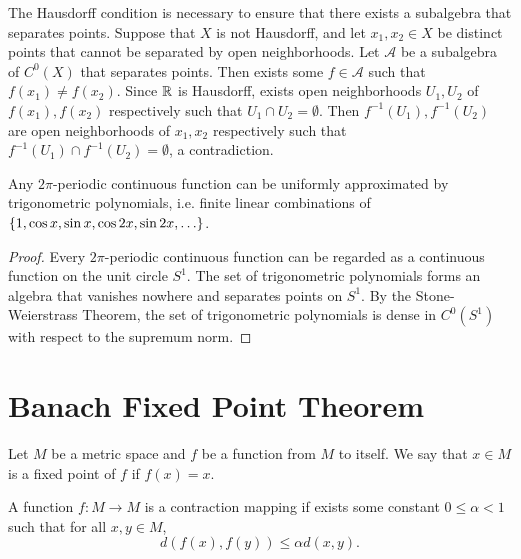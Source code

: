 \begin{rmk}
    The Hausdorff condition is necessary to ensure that there exists a subalgebra that separates points. Suppose that $X$ is not Hausdorff, and let $x_1, x_2 \in X$ be distinct points that cannot be separated by open neighborhoods. Let $\mathcal A$ be a subalgebra of $C^0(X)$ that separates points. Then exists some $f \in \mathcal A$ such that $f(x_1) \neq f(x_2)$. Since ${\mathbb R}$ is Hausdorff, exists open neighborhoods $U_1, U_2$ of $f(x_1), f(x_2)$ respectively such that $U_1 \cap U_2 = \emptyset$. Then $f^{-1}(U_1), f^{-1}(U_2)$ are open neighborhoods of $x_1, x_2$ respectively such that $f^{-1}(U_1) \cap f^{-1}(U_2) = \emptyset$, a contradiction.
\end{rmk}

\begin{cl}
    Any $2\pi$-periodic continuous function can be uniformly approximated by trigonometric polynomials, i.e. finite linear combinations of ${\left\{{1, \cos x, \sin x, \cos 2x, \sin 2x, \ldots}\right\}}$.
    \begin{proof}
        Every $2\pi$-periodic continuous function can be regarded as a continuous function on the unit circle $S^1$. The set of trigonometric polynomials forms an algebra that vanishes nowhere and separates points on $S^1$. By the Stone-Weierstrass Theorem, the set of trigonometric polynomials is dense in $C^0(S^1)$ with respect to the supremum norm.
    \end{proof}
\end{cl}

\section{Banach Fixed Point Theorem}

\begin{df}
    Let $M$ be a metric space and $f$ be a function from $M$ to itself. We say that $x \in M$ is a fixed point of $f$ if $f(x) = x$.
\end{df}

\begin{df}
    A function $f: M \to M$ is a contraction mapping if exists some constant $0 \leq \alpha < 1$ such that for all $x, y \in M$,
    \[
    d(f(x), f(y)) \leq \alpha d(x, y).
    \]
\end{df}

